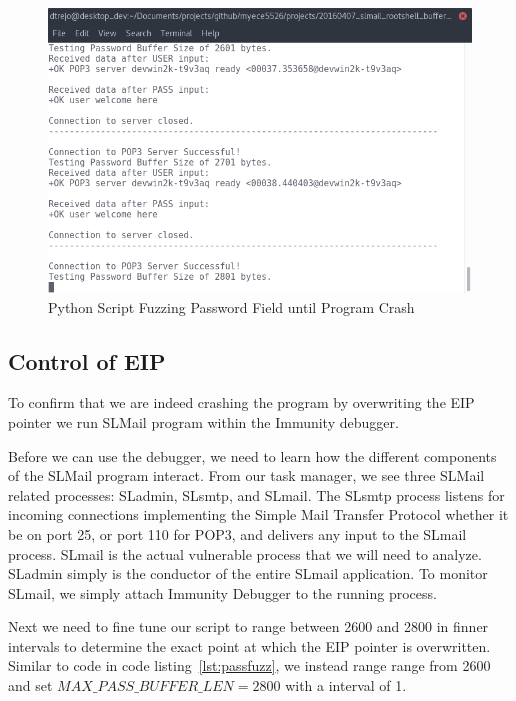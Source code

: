 \documentclass[12pt]{article}
\begin{document}
\begin{figure}[htbp]
    \centering
    \includegraphics[width=5.5in]{images/20160422_python_overflow.png}
    \caption{Python Script Fuzzing Password Field until Program Crash}
    \label{fig:passfuzz}
\end{figure}

\subsection{Control of EIP}
\label{sect:controlEIP}

To confirm that we are indeed crashing the program by overwriting the EIP
pointer we run SLMail program within the Immunity debugger. 

Before we can use the debugger, we need to learn how the different components
of the SLMail program interact. From our task manager, we see three SLMail
related processes: SLadmin, SLsmtp, and SLmail. The SLsmtp process
listens for incoming connections implementing the Simple Mail Transfer Protocol 
whether it be on port 25, or port 110 for POP3, and delivers any input to 
the SLmail process. SLmail is the actual vulnerable process that we will
need to analyze. SLadmin simply is the conductor of the entire SLmail 
application. To monitor SLmail, we simply attach Immunity Debugger to the 
running process. 

Next we need to fine tune our script to range between 2600 and 2800 in
finner intervals to determine the exact point at which the EIP pointer is
overwritten. Similar to code in code listing~\ref{lst:passfuzz}, we instead
range range from 2600 and set $MAX\_PASS\_BUFFER\_LEN = 2800$ with a interval
of 1. 
\end{document}
